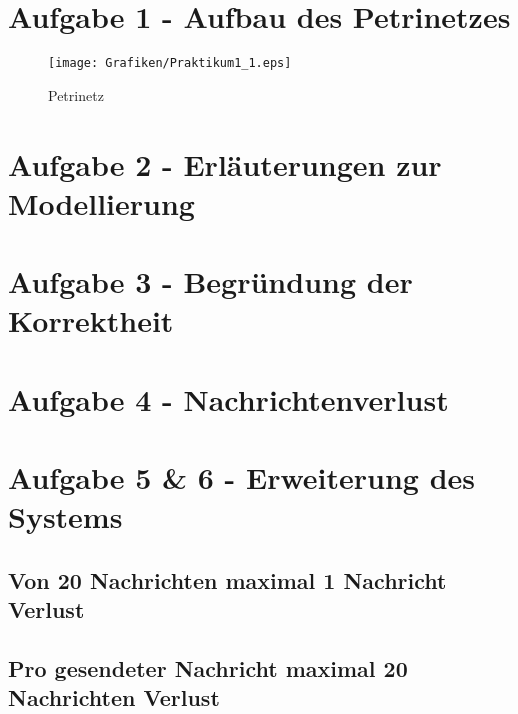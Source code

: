 \documentclass[10pt]{scrartcl}
\author{Carsten Noetzel, Armin Steudte}
\title{\titletext}
\date{23.03.2012}
\begin{document}
\maketitle

\setcounter{tocdepth}{3}
\tableofcontents
\listoffigures

\section{Aufgabe 1 - Aufbau des Petrinetzes}

\begin{figure}[htbp]
	\centering	\texttt{[image: Grafiken/Praktikum1\_1.eps]}
	\caption{Petrinetz}
	\label{fig:Netz}
\end{figure} 

\section{Aufgabe 2 - Erläuterungen zur Modellierung}

\section{Aufgabe 3 - Begründung der Korrektheit}

\section{Aufgabe 4 - Nachrichtenverlust}

\section{Aufgabe 5 \& 6 - Erweiterung des Systems}
\subsection{Von 20 Nachrichten maximal 1 Nachricht Verlust}
\subsection{Pro gesendeter Nachricht maximal 20 Nachrichten Verlust}
\end{document}
